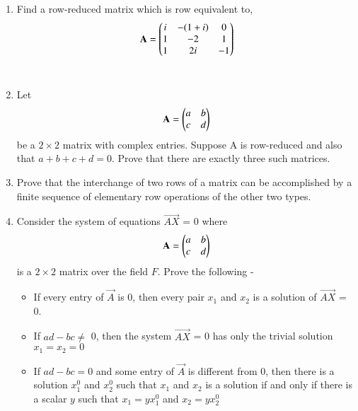 \renewcommand{\theequation}{\theenumi}
\renewcommand{\thefigure}{\theenumi}
\begin{enumerate}[label=\thesubsection.\arabic*.,ref=\thesubsection.\theenumi]
%
\item Find a row-reduced matrix which is row equivalent to,
\begin{align}
\mathbf{A} = \begin{pmatrix}i&-(1+i)&0\\1&-2&1\\1&2i&-1\end{pmatrix}
\label{eq:solutions/1/2/4/A}
\end{align}
\\
\solution

\item Let
\begin{align}
    \mathbf{A}=\begin{pmatrix}a & b\\c & d\end{pmatrix}
\end{align}
be a $2\times2$ matrix with complex entries. Suppose A is row-reduced and also that $a+b+c+d=0$. Prove that there are exactly three such matrices. 
\\
\solution

\item Prove that the interchange of two rows of a matrix can be accomplished by a finite sequence of elementary row operations of the other two types.
\\
\solution

%
\item Consider the system of equations $\vec{AX}$ = 0 where
\begin{align*}
    \mathbf{A} = \begin{pmatrix}a&b\\c&d\end{pmatrix}
\end{align*}
is a $2\times2$ matrix over the field $F$. Prove the following - 
\begin{itemize}
    \item If every entry of $\vec{A}$ is 0, then every pair $x_1$ and $x_2$ is a solution of $\vec{AX}$ = 0.
    \item If $ad - bc \not=$ 0, then the system $\vec{AX}$ = 0 has only the trivial solution $x_1 = x_2 = 0$
    \item If $ad - bc = 0$ and some entry of $\vec{A}$ is different from 0, then there is a solution $x_1^0$ and $x_2^0$ such that $x_1$ and  $x_2$ is a solution if and only if there is a scalar $y$ such that $x_1 = yx_1^0$ and $x_2 = yx_2^0$
\end{itemize}
%
\solution

\end{enumerate}


